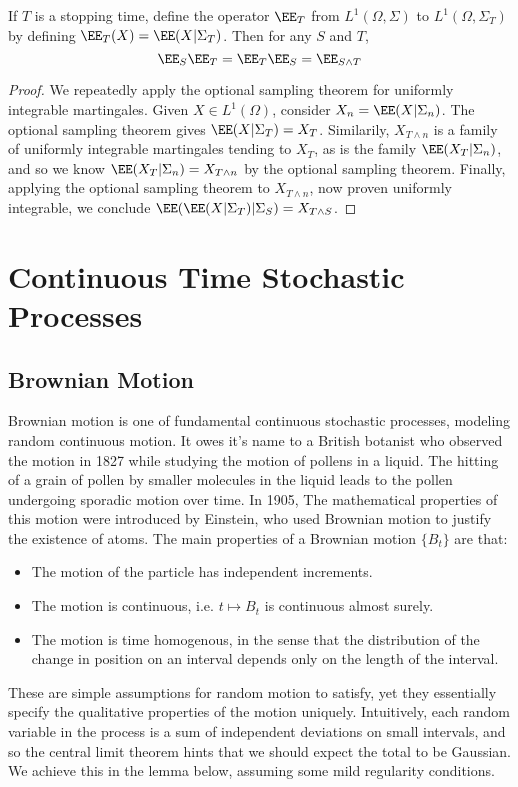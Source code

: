 \begin{theorem}
    If $T$ is a stopping time, define the operator $\EE_T$ from $L^1(\Omega, \Sigma)$ to $L^1(\Omega, \Sigma_T)$ by defining $\EE_T(X) = \EE(X|\Sigma_T)$. Then for any $S$ and $T$,
    \[ \EE_S \EE_T = \EE_T \EE_S = \EE_{S \wedge T} \]
\end{theorem}
\begin{proof}
    We repeatedly apply the optional sampling theorem for uniformly integrable martingales. Given $X \in L^1(\Omega)$, consider $X_n = \EE(X|\Sigma_n)$. The optional sampling theorem gives $\EE(X|\Sigma_T) = X_T$. Similarily, $X_{T \wedge n}$ is a family of uniformly integrable martingales tending to $X_T$, as is the family $\EE(X_T|\Sigma_n)$, and so we know $\EE(X_T|\Sigma_n) = X_{T \wedge n}$ by the optional sampling theorem. Finally, applying the optional sampling theorem to $X_{T \wedge n}$, now proven uniformly integrable, we conclude $\EE(\EE(X|\Sigma_T)|\Sigma_S) = X_{T \wedge S}$.
\end{proof}

\part{Continuous Time Stochastic Processes}






\chapter{Brownian Motion}

Brownian motion is one of fundamental continuous stochastic processes, modeling random continuous motion. It owes it's name to a British botanist who observed the motion in 1827 while studying the motion of pollens in a liquid. The hitting of a grain of pollen by smaller molecules in the liquid leads to the pollen undergoing sporadic motion over time. In 1905, The mathematical properties of this motion were introduced by Einstein, who used Brownian motion to justify the existence of atoms. The main properties of a Brownian motion $\{ B_t \}$ are that:
%
\begin{itemize}
    \item The motion of the particle has independent increments.
    \item The motion is continuous, i.e. $t \mapsto B_t$ is continuous almost surely.
    \item The motion is time homogenous, in the sense that the distribution of the change in position on an interval depends only on the length of the interval.
\end{itemize}
%
These are simple assumptions for random motion to satisfy, yet they essentially specify the qualitative properties of the motion uniquely. Intuitively, each random variable in the process is a sum of independent deviations on small intervals, and so the central limit theorem hints that we should expect the total to be Gaussian. We achieve this in the lemma below, assuming some mild regularity conditions.

